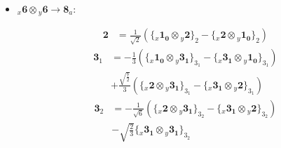 \documentclass[english]{article}
\newcommand{\rep}[1]{\mathbf{#1}}
\newcommand{\repx}[2]{{}_{#2}\mathbf{#1}}
\newcommand{\tsprodx}[2]{\repx{#1}{x}\otimes\repx{#2}{y}}
\newcommand{\subcgs}[3]{\big\{ \tsprodx{#1}{#2}\big\}^{}_{#3}}
\begin{document}
\begin{itemize}
\item $\tsprodx{6}{6}\to\rep{8}_{a}$:
\begin{fleqn}
\begin{align*}
\rep{2} & = \frac{1}{\sqrt{2}}\left(\subcgs{1_{0}}{2}{2}-\subcgs{2}{1_{0}}{2}\right)
\end{align*}
\begin{align*}
\rep{3}_{1} & = -\frac{1}{3}\left(\subcgs{1_{0}}{3_{1}}{3_{1}}-\subcgs{3_{1}}{1_{0}}{3_{1}}\right) \\ 
 & +\frac{\sqrt{\frac{7}{2}}}{3}\left(\subcgs{2}{3_{1}}{3_{1}}-\subcgs{3_{1}}{2}{3_{1}}\right)
\end{align*}
\begin{align*}
\rep{3}_{2} & = -\frac{1}{\sqrt{6}}\left(\subcgs{2}{3_{1}}{3_{2}}-\subcgs{3_{1}}{2}{3_{2}}\right) \\ 
 & -\sqrt{\frac{2}{3}}\subcgs{3_{1}}{3_{1}}{3_{2}}
\end{align*}
\end{fleqn}
\end{itemize}
\end{document}
